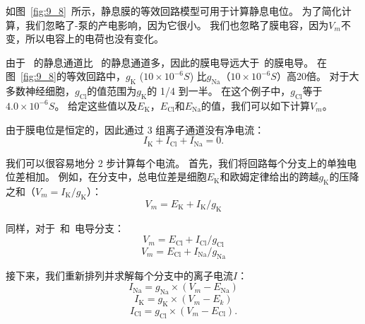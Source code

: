 \begin{proposition}[利用等效回路模型计算静息膜电位] \label{box:9_2}
	
	\quad \quad 如图~\ref{fig:9_8}~所示，静息膜的等效回路模型可用于计算静息电位。
	为了简化计算，我们忽略了-泵的产电影响，因为它很小。
	我们也忽略了膜电容，因为$V_m$不变，所以电容上的电荷也没有变化。
	
	\quad \quad 由于~ 的静息通道比~ 的静息通道多，因此的膜电导远大于~的膜电导。
	在图~\ref{fig:9_8}的等效回路中，$ g_\text{K} $ ($ 10\times 10^{-6} S $) 比$ g_\text{Na} $（$ 10 \times 10^{-6} S $）高20倍。
	对于大多数神经细胞，$ g_\text{Cl} $的值范围为$ g_\text{K} $的 1/4 到一半。
	在这个例子中，$ g_\text{Cl} $等于 $ 4.0 \times 10^{-6} S $。
	给定这些值以及$E_\text{K}$，$E_\text{Cl}$和$ E_\text{Na} $的值，我们可以如下计算$V_m$。
	
	\quad \quad 由于膜电位是恒定的，因此通过 3 组离子通道没有净电流：
	\begin{equation}\label{eq:9_three_sets}
		I_\text{K} + I_\text{Cl} + I_\text{Na} = 0.
	\end{equation}
	
	\quad \quad 我们可以很容易地分 2 步计算每个电流。
	首先，我们将回路每个分支上的单独电位差相加。
	例如，在分支中，总电位差是细胞$E_\text{K}$和欧姆定律给出的跨越$ g_\text{K} $的压降之和（$ V_m = I_\text{K} / g_\text{K} $）：
	\begin{equation}\label{eq:9_voltage_drop}
		V_m = E_\text{K} + I_\text{K} / g_\text{K}
	\end{equation}
	
	\quad \quad 同样，对于~和~电导分支：
	\begin{equation}\label{eq:9_Na_conductance}
		V_m = E_\text{Cl} + I_\text{Cl} / g_\text{Cl}
	\end{equation}
	\begin{equation}\label{eq:9_Cl_conductance}
		V_m = E_\text{Cl} + I_\text{Na} / g_\text{Na}
	\end{equation}
	
	\quad \quad 接下来，我们重新排列并求解每个分支中的离子电流$ I $：
	\begin{equation}\label{eq:9_ionic_current_Na}
		I_\text{Na} = g_\text{Na} \times (V_m - E_\text{Na})
	\end{equation}
	\begin{equation}\label{eq:9_ionic_current_K}
		I_\text{K} = g_\text{K} \times (V_m - E_k)
	\end{equation}
	\begin{equation}\label{eq:9_ionic_current_Cl}
		I_\text{Cl} = g_\text{Cl} \times (V_m - E_\text{Cl}).
	\end{equation}
	

\end{proposition}
